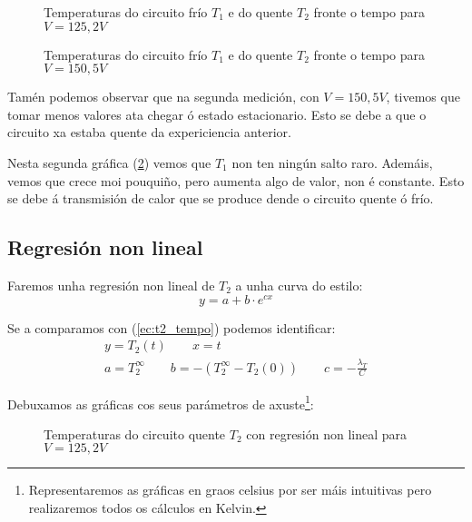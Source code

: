 \documentclass[12pt, a4paper, titlepage]{article}
\begin{document}
  \begin{figure}[H]
    \hspace{12pt}
    
    \caption{Temperaturas do circuito frío $T_1$ e do quente $T_2$ fronte o tempo para $V = 125,2V$}
    \label{fig:v125a}
  \end{figure}

  \begin{figure}[H]
    \hspace{12pt}
    
    \caption{Temperaturas do circuito frío $T_1$ e do quente $T_2$ fronte o tempo para $V = 150,5V$}
    \label{fig:v150a}
  \end{figure}

  Tamén podemos observar que na segunda medición, con $V = 150,5V$, tivemos que tomar menos valores ata chegar ó estado estacionario. Esto se debe a que o circuito xa estaba quente da expericiencia anterior.
 
  Nesta segunda gráfica (\ref{fig:v150a}) vemos que $T_1$ non ten ningún salto raro. Ademáis, vemos que crece moi pouquiño, pero aumenta algo de valor, non é constante. Esto se debe á transmisión de calor que se produce dende o circuito quente ó frío.

  \subsection{Regresión non lineal}

  Faremos unha regresión non lineal de $T_2$ a unha curva do estilo:
  \begin{equation}
    y = a + b \cdot e^{cx}
  \end{equation}

  Se a comparamos con (\ref{ec:t2_tempo}) podemos identificar:
  \begin{gather*}
    y = T_2(t) \qquad x = t \\
    a = T_2^\infty \qquad b = -(T_2^\infty - T_2(0)) \qquad c = -\frac{\lambda_T}{C}
  \end{gather*}

  Debuxamos as gráficas cos seus parámetros de axuste\footnote{Representaremos as gráficas en graos celsius por ser máis intuitivas pero realizaremos todos os cálculos en Kelvin.}:

  \begin{figure}[H]
    \hspace{12pt}
    
    \caption{Temperaturas do circuito quente $T_2$ con regresión non lineal para $V = 125,2V$}
    \label{fig:v125ar}
  \end{figure}
\end{document}
